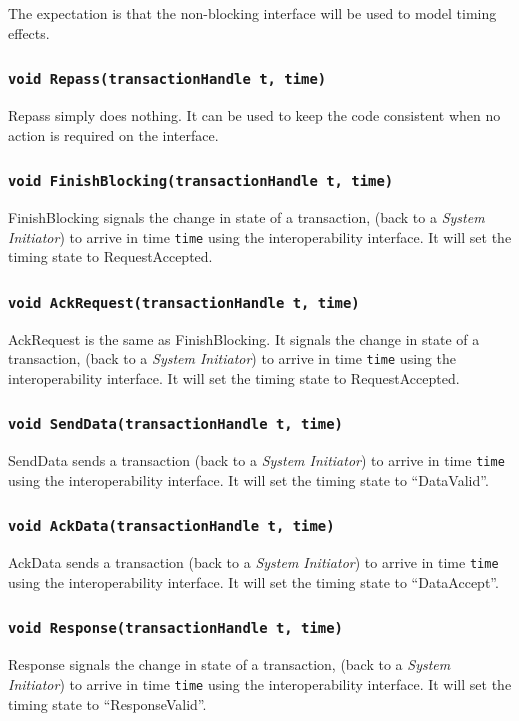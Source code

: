 \documentclass[12pt,oneside]{gsbook}
\newcommand{\master}{{\em System Initiator}\xspace}
\begin{document}
The expectation is that the non-blocking interface will be used to
model timing effects. 

\subsubsection    {\tt void Repass(transactionHandle t, time)}
Repass simply does nothing. It can be used to keep the code consistent
when no action is required on the interface.


\subsubsection    {\tt void FinishBlocking(transactionHandle t, time)}
FinishBlocking signals the change in state of a transaction, (back to a \master)  to arrive in time {\tt time} using the
interoperability interface. It will set the timing state to RequestAccepted.

\subsubsection    {\tt void AckRequest(transactionHandle t, time)}
AckRequest is the same as FinishBlocking. It signals the change in state of a transaction, (back
to a \master) to arrive in time {\tt time} using the interoperability
interface. It will set the timing state to RequestAccepted.

\subsubsection    {\tt void SendData(transactionHandle t, time)}
SendData  sends  a transaction (back to a \master) to arrive in time {\tt time} using the
interoperability interface. It will set the timing state to
``DataValid''.

\subsubsection    {\tt void AckData(transactionHandle t, time)}
AckData sends  a transaction (back to a \master) to arrive in time {\tt time} using the
interoperability interface. It will set the timing state to
``DataAccept''.

\subsubsection    {\tt void Response(transactionHandle t, time)}
Response signals the change in state of a transaction, (back to a \master)  to arrive in time {\tt time} using the
interoperability interface. It will set the timing state to
``ResponseValid''.
\end{document}
